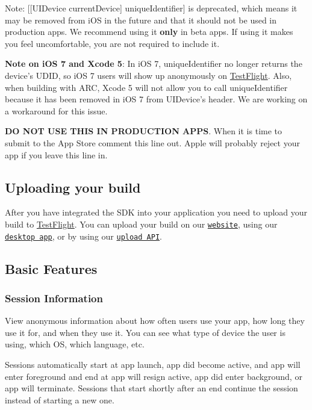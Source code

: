 Note\-: {\ttfamily \mbox{[}\mbox{[}U\-I\-Device current\-Device\mbox{]} unique\-Identifier\mbox{]}} is deprecated, which means it may be removed from i\-O\-S in the future and that it should not be used in production apps. We recommend using it {\bfseries only} in beta apps. If using it makes you feel uncomfortable, you are not required to include it.

{\bfseries Note on i\-O\-S 7 and Xcode 5}\-: In i\-O\-S 7, {\ttfamily unique\-Identifier} no longer returns the device's U\-D\-I\-D, so i\-O\-S 7 users will show up anonymously on \hyperlink{interface_test_flight}{Test\-Flight}. Also, when building with A\-R\-C, Xcode 5 will not allow you to call {\ttfamily unique\-Identifier} because it has been removed in i\-O\-S 7 from {\ttfamily U\-I\-Device}'s header. We are working on a workaround for this issue.

{\bfseries D\-O N\-O\-T U\-S\-E T\-H\-I\-S I\-N P\-R\-O\-D\-U\-C\-T\-I\-O\-N A\-P\-P\-S}. When it is time to submit to the App Store comment this line out. Apple will probably reject your app if you leave this line in.

\subsection*{Uploading your build}

After you have integrated the S\-D\-K into your application you need to upload your build to \hyperlink{interface_test_flight}{Test\-Flight}. You can upload your build on our \href{https://testflightapp.com/dashboard/builds/add/}{\tt website}, using our \href{https://testflightapp.com/desktop/}{\tt desktop app}, or by using our \href{https://testflightapp.com/api/doc/}{\tt upload A\-P\-I}.

\subsection*{Basic Features}

\subsubsection*{Session Information}

View anonymous information about how often users use your app, how long they use it for, and when they use it. You can see what type of device the user is using, which O\-S, which language, etc.

Sessions automatically start at app launch, app did become active, and app will enter foreground and end at app will resign active, app did enter background, or app will terminate. Sessions that start shortly after an end continue the session instead of starting a new one.


